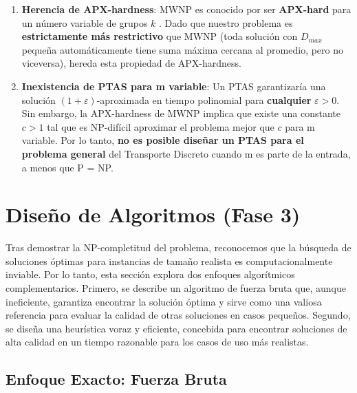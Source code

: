\documentclass[12pt, a4paper]{article}
\begin{document}
    \begin{enumerate}
    \item \textbf{Herencia de APX-hardness}: MWNP es conocido por ser \textbf{APX-hard} para un número variable de grupos $k$ \cite{korf1998optimal}. Dado que nuestro problema es \textbf{estrictamente más restrictivo} que MWNP (toda solución con $D_{max}$ pequeña automáticamente tiene suma máxima cercana al promedio, pero no viceversa), hereda esta propiedad de APX-hardness.

    \item \textbf{Inexistencia de PTAS para m variable}: Un PTAS garantizaría una solución $(1+\varepsilon)$-aproximada en tiempo polinomial para \textbf{cualquier} $\varepsilon > 0$. Sin embargo, la APX-hardness de MWNP implica que existe una constante $c > 1$ tal que es NP-difícil aproximar el problema mejor que $c$ para m variable. Por lo tanto, \textbf{no es posible diseñar un PTAS para el problema general} del Transporte Discreto cuando m es parte de la entrada, a menos que P = NP.

    \end{enumerate}
    \section{Diseño de Algoritmos (Fase 3)}
    Tras demostrar la NP-completitud del problema, reconocemos que la búsqueda de soluciones óptimas para instancias de tamaño realista es computacionalmente inviable. Por lo tanto, esta sección explora dos enfoques algorítmicos complementarios. Primero, se describe un algoritmo de fuerza bruta que, aunque ineficiente, garantiza encontrar la solución óptima y sirve como una valiosa referencia para evaluar la calidad de otras soluciones en casos pequeños. Segundo, se diseña una heurística voraz y eficiente, concebida para encontrar soluciones de alta calidad en un tiempo razonable para los casos de uso más realistas.

    \subsection{Enfoque Exacto: Fuerza Bruta}
\end{document}
